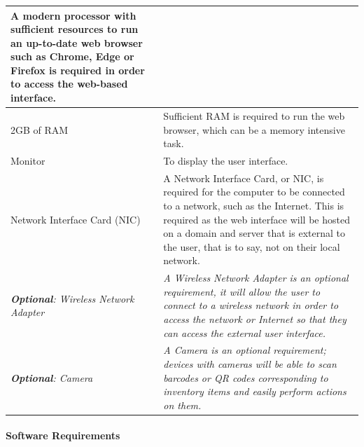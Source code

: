\documentclass{article}
\begin{document}
\begin{tabular}{ |p{}|p{}| }
    A modern processor with sufficient resources to run an up-to-date web browser such as Chrome, Edge or Firefox is required in order to access the web-based interface.                                                                                                                                                           \\
    \hline
    2GB of RAM                                           & Sufficient RAM is required to run the web browser, which can be a memory intensive task.                                                                                                                                                                                 \\
    \hline
    Monitor                                              & To display the user interface.                                                                                                                                                                                                                                           \\
    \hline
    Network Interface Card (NIC)                         & A Network Interface Card, or NIC, is required for the computer to be connected to a network, such as the Internet. This is required as the web interface will be hosted on a domain and server that is external to the user, that is to say, not on their local network. \\
    \hline
    \textit{\textbf{Optional}: Wireless Network Adapter} & \textit{A Wireless Network Adapter is an optional requirement, it will allow the user to connect to a wireless network in order to access the network or Internet so that they can access the external user interface.}                                                  \\
    \hline
    \textit{\textbf{Optional}: Camera}                   & \textit{A Camera is an optional requirement; devices with cameras will be able to scan barcodes or QR codes corresponding to inventory items and easily perform actions on them.}                                                                                        \\
    \hline
\end{tabular}

\paragraph{Software Requirements\\\\}
\end{document}
